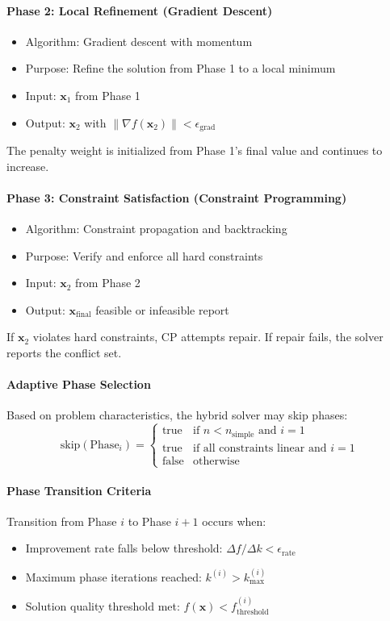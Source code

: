 \paragraph{Phase 2: Local Refinement (Gradient Descent)}
\begin{itemize}
\item Algorithm: Gradient descent with momentum
\item Purpose: Refine the solution from Phase 1 to a local minimum
\item Input: $\mathbf{x}_1$ from Phase 1
\item Output: $\mathbf{x}_2$ with $\|\nabla f(\mathbf{x}_2)\| < \epsilon_{\text{grad}}$
\end{itemize}
The penalty weight is initialized from Phase 1's final value and continues to increase.

\paragraph{Phase 3: Constraint Satisfaction (Constraint Programming)}
\begin{itemize}
\item Algorithm: Constraint propagation and backtracking
\item Purpose: Verify and enforce all hard constraints
\item Input: $\mathbf{x}_2$ from Phase 2
\item Output: $\mathbf{x}_{\text{final}}$ feasible or infeasible report
\end{itemize}
If $\mathbf{x}_2$ violates hard constraints, CP attempts repair. If repair fails, the solver reports the conflict set.

\paragraph{Adaptive Phase Selection}
Based on problem characteristics, the hybrid solver may skip phases:
\begin{equation}
\text{skip}(\text{Phase}_i) = \begin{cases}
\text{true} & \text{if } n < n_{\text{simple}} \text{ and } i = 1 \\
\text{true} & \text{if } \text{all constraints linear} \text{ and } i = 1 \\
\text{false} & \text{otherwise}
\end{cases}
\end{equation}

\paragraph{Phase Transition Criteria}
Transition from Phase $i$ to Phase $i+1$ occurs when:
\begin{itemize}
\item Improvement rate falls below threshold: $\Delta f / \Delta k < \epsilon_{\text{rate}}$
\item Maximum phase iterations reached: $k^{(i)} > k_{\max}^{(i)}$
\item Solution quality threshold met: $f(\mathbf{x}) < f_{\text{threshold}}^{(i)}$
\end{itemize}

